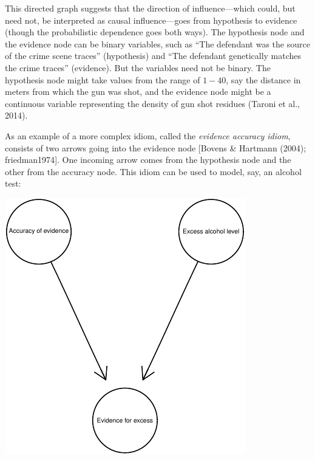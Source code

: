 \documentclass[11pt,dvipsnames,enabledeprecatedfontcommands]{scrartcl}
\begin{document}
\noindent  This directed graph suggests that the direction of
influence---which could, but need not, be interpreted as causal
influence---goes from hypothesis to evidence (though the probabilistic
dependence goes both ways). The hypothesis node and the evidence node
can be binary variables, such as ``The defendant was the source of the
crime scene traces'' (hypothesis) and ``The defendant genetically
matches the crime traces'' (evidence). But the variables need not be
binary. The hypothesis node might take values from the range of
\(1-40\), say the distance in meters from which the gun was shot, and
the evidence node might be a continuous variable representing the
density of gun shot residues (Taroni et al., 2014).

As an example of a more complex idiom, called the
\emph{evidence accuracy
idiom}, consists of two arrows going into the evidence node {[}Bovens \&
Hartmann (2004); friedman1974{]}. One incoming arrow comes from the
hypothesis node and the other from the accuracy node. This idiom can be
used to model, say, an alcohol test:

\begin{center}\includegraphics{BNfiles/unnamed-chunk-7-1} \end{center}
\end{document}
